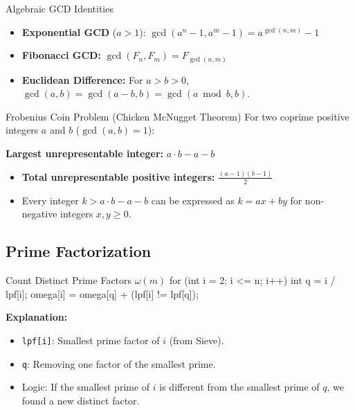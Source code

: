 \documentclass[10pt]{article}
\newcommand{\complexity}[1]{%
  \tcbox[on line,
    colback=tagbg,
    colframe=tagbg,
    boxrule=0pt,
    arc=2pt,
    boxsep=0pt,
    left=3.5pt, right=3.5pt, top=1.5pt, bottom=1.5pt
  ]{\color{tagtext}\scriptsize\bfseries\ensuremath{#1}}%
}
\begin{document}
\begin{conceptbox}{Algebraic GCD Identities}
    \begin{itemize}
        \item \textbf{Exponential GCD} ($a > 1$): $\gcd(a^n - 1, a^m - 1) = a^{\gcd(n, m)} - 1$
        \item \textbf{Fibonacci GCD:} $\gcd(F_n, F_m) = F_{\gcd(n, m)}$
        \item \textbf{Euclidean Difference:} For $a > b > 0$, $\gcd(a, b) = \gcd(a - b, b) = \gcd(a \bmod b, b)$.
    \end{itemize}
\end{conceptbox}

\begin{conceptbox}{Frobenius Coin Problem (Chicken McNugget Theorem)}
    For two coprime positive integers $a$ and $b$ ($\gcd(a, b) = 1$):
    \begin{resultbox}
        \textbf{Largest unrepresentable integer:} $a \cdot b - a - b$
    \end{resultbox}
    \begin{itemize}
        \item \textbf{Total unrepresentable positive integers:} $\frac{(a - 1)(b - 1)}{2}$
        \item Every integer $k > a \cdot b - a - b$ can be expressed as $k = a x + b y$ for non-negative integers $x, y \ge 0$.
    \end{itemize}
\end{conceptbox}

\subsection{Prime Factorization}

\begin{vscode}{Count Distinct Prime Factors $\omega(m)$ \complexity{O(N)}}
for (int i = 2; i <= n; i++)
{
    int q = i / lpf[i];
    omega[i] = omega[q] + (lpf[i] != lpf[q]);
}
\end{vscode}
\begin{derivation}
    \textbf{Explanation:}
    \begin{itemize}
        \item \texttt{lpf[i]}: Smallest prime factor of $i$ (from Sieve).
        \item \texttt{q}: Removing one factor of the smallest prime.
        \item Logic: If the smallest prime of $i$ is different from the smallest prime of $q$, we found a new distinct factor.
    \end{itemize}
\end{derivation}
\end{document}
